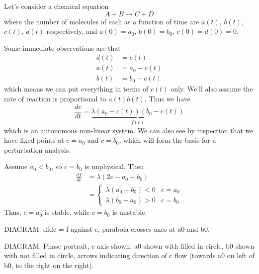 \documentclass{../../template/note}
\begin{document}
    \begin{example}
        Let's consider a chemical equation
        \[
            A + B \to C + D
        \]
        where the number of molecules of each as a function of time are \(a(t)\), \(b(t)\), \(c(t)\), \(d(t)\) respectively, and \(a(0) = a_0\), \(b(0) = b_0\), \(c(0) = d(0) = 0\).

        Some immediate observations are that
        \begin{align*}
            d(t) &= c(t) \\
            a(t) &= a_0 - c(t) \\
            b(t) &= b_0 - c(t)
        \end{align*}
        which means we can put everything in terms of \(c(t)\) only. We'll also assume the rate of reaction is proportional to \(a(t)b(t)\). Thus we have
        \[
            \frac{dc}{dt} = \underbrace{\lambda(a_0-c(t))(b_0-c(t))}_{f(c)}
        \]
        which is an autonomous non-linear system. We can also see by inspection that we have fixed points at \(c = a_0\) and \(c = b_0\), which will form the basis for a perturbation analysis.

        Assume \(a_0 < b_0\), so \(c = b_0\) is unphysical. Then
        \begin{align*}
            \frac{df}{dc} &= \lambda(2c - a_0 - b_0) \\
            &= \begin{cases}
                \lambda(a_0-b_0) < 0 & c = a_0 \\
                \lambda(b_0-a_0) > 0 & c = b_0
            \end{cases}
        \end{align*}
        Thus, \(c = a_0\) is stable, while \(c = b_0\) is unstable.

        DIAGRAM: dfdc = f against c, parabola crosses axes at a0 and b0.

        DIAGRAM: Phase portrait, c axis shown, a0 shown with filled in circle, b0 shown with not filled in circle, arrows indicating direction of c flow (towards a0 on left of b0, to the right on the right).
        
    \end{example}
    
\end{document}
